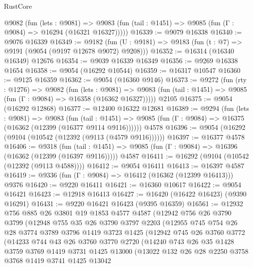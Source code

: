 \begin{lexlean}{RustCore}
\begin{coremodule}
    @9082
      (fun (lets : @9081) =>
      @9083 (fun (tail : @1451) => @9085 (fun (Γ : @9084) => @16294 (@16321 @16327)))))
@16339 := @9079 @16338
@16340 := @9076 @16339
@16349 := @9182
    (fun (U : @9181) => @9183 (fun (t : @7) => @9191 (@9054 (@9197 @12678 @9072) @9208)))
@16352 := @16314 (@16340 @16349) @12676
@16354 := @9039 @16339 @16349
@16356 := @9269 @16338 @1654
@16358 := @9054 (@16292 @10544)
@16359 := @16317 @10547
@16360 := @9125 @16359
@16362 := @9054 (@16360 @9146)
@16373 := @9272
    (fun (rty : @1276) =>
    @9082
      (fun (lets : @9081) =>
      @9083 (fun (tail : @1451) => @9085 (fun (Γ : @9084) => @16358 (@16362 @16327)))))
    @2105
@16375 := @9054 (@16292 @12868)
@16377 := @12400 @16322 @12681
@16389 := @9294
    (fun (lets : @9081) =>
    @9083
      (fun (tail : @1451) =>
      @9085 (fun (Γ : @9084) => @16375 (@16362 (@12399 (@16377 @9114 @9116))))))
    @4578
@16396 := @9054 (@16292 (@9104 (@10542 (@12392 (@9113 (@4579 @9116))))))
@16397 := @16377 @4578
@16406 := @9318
    (fun (tail : @1451) => @9085 (fun (Γ : @9084) => @16396 (@16362 (@12399 (@16397 @9116)))))
    @4587
@16411 := @16292 (@9104 (@10542 (@12392 (@9113 @4588))))
@16412 := @9054 @16411
@16413 := @16397 @4587
@16419 := @9336 (fun (Γ : @9084) => @16412 (@16362 (@12399 @16413))) @9376
@16420 := @9220 @16411
@16421 := @16360 @10617
@16422 := @9054 @16421
@16423 := @12918 @16413
@16427 := @16420 (@16422 @16423) (@9390 @16291)
@16431 := @9220 @16421 @16423 (@9395 @16359)
@16561 := @12932
    @756
    @885
    @26
    @3801
    @19
    @1853
    @4577
    @4587
    (@12942
      @756
      @26
      @3790
      @3799
      (@12948
        @755
        @35
        @26
        @3790
        @3797
        @2203
        (@12955
          @745
          @754
          @26
          @28
          @3774
          @3789
          @3796
          @1419
          @3723
          @1425
          (@12942
            @745
            @26
            @3760
            @3772
            (@14233
              @744
              @43
              @26
              @3760
              @3770
              @2720
              (@14240
                @743
                @26
                @35
                @1428
                @3759
                @3769
                @1419
                @3731
                @1425
                @13000
                (@13022
                  @132
                  @26
                  @28
                  @2250
                  @3758
                  @3768
                  @1419
                  @3741
                  @1425
                  @13042

\end{coremodule}
\end{lexlean}
